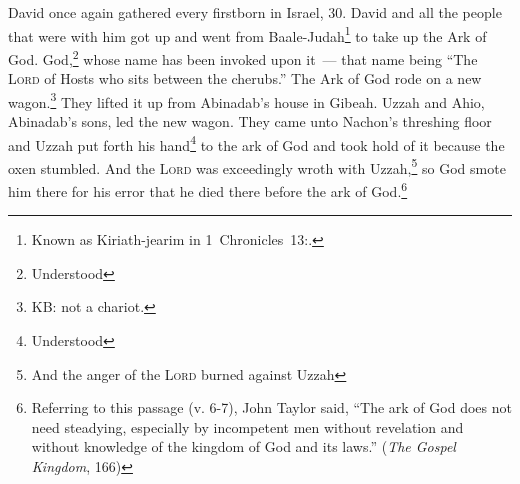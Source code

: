 
\begin{inparaenum}
     David once again gathered every firstborn in Israel, 30.%
     David and all the people that were with him got up and went from Baale-Judah\footnote{Known as Kiriath-jearim in 1~Chronicles~13\thinspace:.} to take up the Ark of God. God,\footnote{Understood} whose name has been invoked upon it~--- that name being ``The \textsc{Lord} of Hosts who sits between the cherubs.''%
     The Ark of God rode on a new wagon.\footnote{KB: not a chariot.} They lifted it up from Abinadab's house in Gibeah. Uzzah and Ahio, Abinadab's sons, led the new wagon.%
     They came unto Nachon's threshing floor and Uzzah put forth his hand\footnote{Understood} to the ark of God and took hold of it because the oxen stumbled.%
     And the \textsc{Lord} was exceedingly wroth with Uzzah,\footnote{And the anger of the \textsc{Lord} burned against Uzzah} so God smote him there for his error that he died there before the ark of God.\footnote{Referring to this passage (v. 6-7), John Taylor said, ``The ark of God does not need steadying, especially by incompetent men without revelation and without knowledge of the kingdom of God and its laws.'' (\textit{The Gospel Kingdom}, 166)}%
\end{inparaenum}
